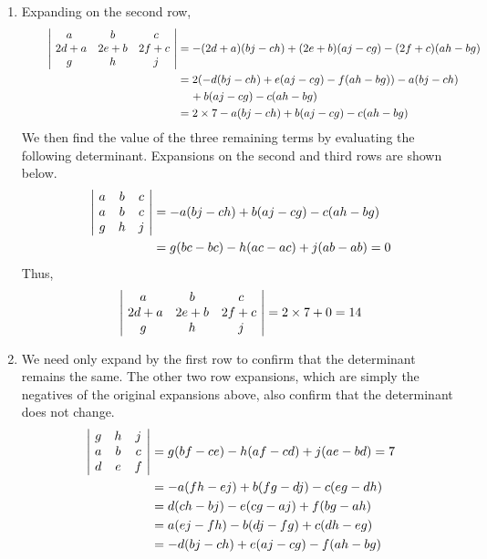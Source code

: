 \documentclass[12pt]{amsart}
\begin{document}
\begin{enumerate}
\begin{enumerate}
			\item Expanding on the second row,
			\begin{align}
				\hspace{0.8cm}
				\begin{vmatrix}
					a &b &c \\
					\text{ }2d+a &2e+b &2f+c \text{ } \\
					g &h &j
				\end{vmatrix}&=-(2d+a)(bj-ch)+(2e+b)(aj-cg)-(2f+c)(ah-bg) \notag \\
				&=2(-d(bj-ch)+e(aj-cg)-f(ah-bg))-a(bj-ch) \notag \\
				&\hspace{0.4cm} +b(aj-cg)-c(ah-bg) \notag \\
				&=2\times7-a(bj-ch)+b(aj-cg)-c(ah-bg) \notag
			\end{align}
			We then find the value of the three remaining terms by evaluating the following determinant.
			Expansions on the second and third rows are shown below.
			\begin{align}
				\begin{vmatrix}
					\text{ }a &b &c \text{ } \\
					\text{ }a &b &c \text{ } \\
					\text{ }g &h &j \text{ }
				\end{vmatrix}&=-a(bj-ch)+b(aj-cg)-c(ah-bg) \notag \\
				&=g(bc-bc)-h(ac-ac)+j(ab-ab)=0 \notag
				\notag
				\end{align}
			Thus,
			\begin{align}
				\begin{vmatrix}
					a &b &c \\
					\text{ }2d+a &2e+b &2f+c \text{ } \\
					g &h &j
				\end{vmatrix} =2\times7+0=14 \notag
			\end{align}
			
			\item We need only expand by the first row to confirm that the determinant remains the same. 
				The other two row expansions, which are simply the negatives of the original expansions
				above, also confirm that the determinant does not change.
			\begin{align}
				\begin{vmatrix}
					\text{ }g &h &j \text{ } \\
					\text{ }a &b &c \text{ } \\
					\text{ }d &e &f \text{ }
				\end{vmatrix}
				&=g(bf-ce)-h(af-cd)+j(ae-bd)=7  \notag \\
				&=-a(fh-ej)+b(fg-dj)-c(eg-dh) \notag \\
				&=d(ch-bj)-e(cg-aj)+f(bg-ah) \notag \\		
				&=a(ej-fh)-b(dj-fg)+c(dh-eg) \notag \\
				&=-d(bj-ch)+e(aj-cg)-f(ah-bg) \notag	
			\end{align}


\end{enumerate}
\end{enumerate}
\end{document}
